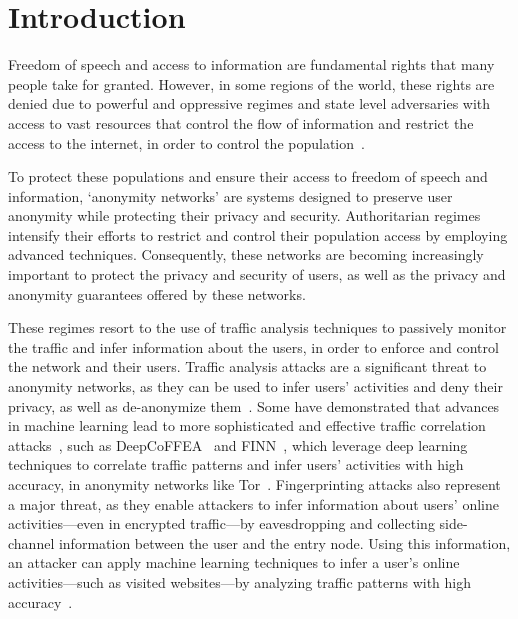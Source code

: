 
%

\chapter{Introduction}\label{cha:introduction}

Freedom of speech and access to information are fundamental rights that many people take for granted. However, in some regions of the world, these rights are denied due to powerful and oppressive regimes and state level adversaries with access to vast resources that control the flow of information and restrict the access to the internet, in order to control the population~\cite*{aryan2013internet, zittrain2017shifting, alimardani2018internet}. 

To protect these populations and ensure their access to freedom of speech and information, `anonymity networks' are systems designed to preserve user anonymity while protecting their privacy and security. 
Authoritarian regimes intensify their efforts to restrict and control their population access by employing advanced techniques. 
Consequently, these networks are becoming increasingly important to protect the privacy and security of users, as well as the privacy and anonymity guarantees offered by these networks.

These regimes resort to the use of traffic analysis techniques to passively monitor the traffic and infer information about the users, in order to enforce and control the network and their users. 
Traffic analysis attacks are a significant threat to anonymity networks, as they can be used to infer users' activities and deny their privacy, as well as de-anonymize them~\cite*{chakravarty2014trafficanalysis, winter2012great, robjansen2019dosontor}.
Some have demonstrated that advances in machine learning lead to more sophisticated and effective traffic correlation attacks~\cite*{DeepCorr, TorMarker, TirDeanon}, such as DeepCoFFEA~\cite{DeepCoFFEA} and FINN~\cite{FINN}, which leverage deep learning techniques to correlate traffic patterns and infer users' activities with high accuracy, in anonymity networks like Tor~\cite{johnson2013users}.
Fingerprinting attacks also represent a major threat, as they enable attackers to infer information about users' online activities—even in encrypted traffic—by eavesdropping and collecting side-channel information between the user and the entry node.
Using this information, an attacker can apply machine learning techniques to infer a user's online activities—such as visited websites—by analyzing traffic patterns with high accuracy~\cite*{DeepFingerprinting, TikTok, OnlineWebFingerprinting}.

